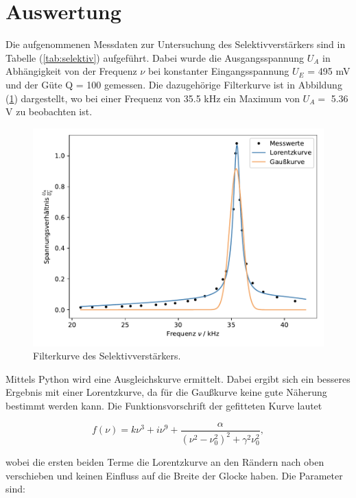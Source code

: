 \newpage
\section{Auswertung}
\noindent
Die aufgenommenen Messdaten zur Untersuchung des Selektivverstärkers sind in Tabelle (\ref{tab:selektiv}) aufgeführt.
Dabei wurde die Ausgangsspannung $U_A$ in Abhängigkeit von der Frequenz $\nu$ bei konstanter Eingangsspannung $U_E$ = 495 mV und der Güte Q = 100 gemessen.
Die dazugehörige Filterkurve ist in Abbildung (\ref{fig:selektiv}) dargestellt, 
wo bei einer Frequenz von 35.5 kHz ein Maximum von $U_A =$ 5.36 V
zu beobachten ist.

\begin{figure}
    \centering
       \includegraphics[width=\textwidth]{Daten/x6.pdf}
       \caption{Filterkurve des Selektivverstärkers.}
       \label{fig:selektiv}
\end{figure}

\noindent
Mittels Python wird eine Ausgleichskurve ermittelt.
Dabei ergibt sich ein besseres Ergebnis mit einer Lorentzkurve, da für die Gaußkurve keine gute Näherung bestimmt werden kann.
Die Funktionsvorschrift der gefitteten Kurve lautet

\begin{equation*}
f(\nu) = k\nu^3 + i\nu^9 + \frac{\alpha}{(\nu^2 - \nu_0^2)^2 + \gamma^2\nu_0^2},
\end{equation*}

\noindent
wobei die ersten beiden Terme die Lorentzkurve an den Rändern nach oben verschieben und keinen Einfluss auf die Breite der Glocke haben.
Die Parameter sind:

